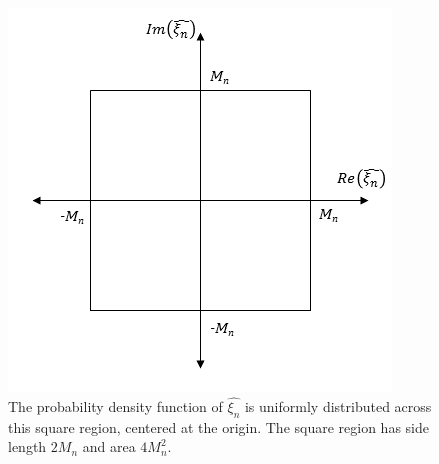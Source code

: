 \begin{figure}[!h]
\caption[Uniform Distribution over a Square Region]{The probability
  density function of $\hat{\xi_n}$ is uniformly distributed across
  this square region, centered at the origin. The square region has
  side length $2M_n$ and area $4M_n^2$.}\label{fig:square}
	\begin{center}
		\includegraphics[scale=0.7]{figs/square.png}
	\end{center}
\end{figure}

